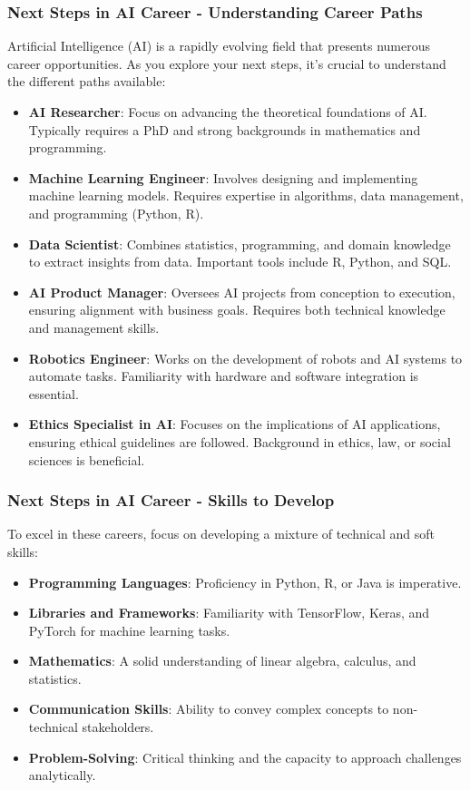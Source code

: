\documentclass[aspectratio=169]{beamer}
\begin{document}
\begin{frame}[fragile]
    \frametitle{Next Steps in AI Career - Understanding Career Paths}
    Artificial Intelligence (AI) is a rapidly evolving field that presents numerous career opportunities. As you explore your next steps, it’s crucial to understand the different paths available:
    \begin{itemize}
        \item \textbf{AI Researcher}: Focus on advancing the theoretical foundations of AI. Typically requires a PhD and strong backgrounds in mathematics and programming.
        \item \textbf{Machine Learning Engineer}: Involves designing and implementing machine learning models. Requires expertise in algorithms, data management, and programming (Python, R).
        \item \textbf{Data Scientist}: Combines statistics, programming, and domain knowledge to extract insights from data. Important tools include R, Python, and SQL.
        \item \textbf{AI Product Manager}: Oversees AI projects from conception to execution, ensuring alignment with business goals. Requires both technical knowledge and management skills.
        \item \textbf{Robotics Engineer}: Works on the development of robots and AI systems to automate tasks. Familiarity with hardware and software integration is essential.
        \item \textbf{Ethics Specialist in AI}: Focuses on the implications of AI applications, ensuring ethical guidelines are followed. Background in ethics, law, or social sciences is beneficial.
    \end{itemize}
\end{frame}

\begin{frame}[fragile]
    \frametitle{Next Steps in AI Career - Skills to Develop}
    To excel in these careers, focus on developing a mixture of technical and soft skills:
    \begin{itemize}
        \item \textbf{Programming Languages}: Proficiency in Python, R, or Java is imperative.
        \item \textbf{Libraries and Frameworks}: Familiarity with TensorFlow, Keras, and PyTorch for machine learning tasks.
        \item \textbf{Mathematics}: A solid understanding of linear algebra, calculus, and statistics.
        \item \textbf{Communication Skills}: Ability to convey complex concepts to non-technical stakeholders.
        \item \textbf{Problem-Solving}: Critical thinking and the capacity to approach challenges analytically.
    \end{itemize}
\end{frame}
\end{document}
